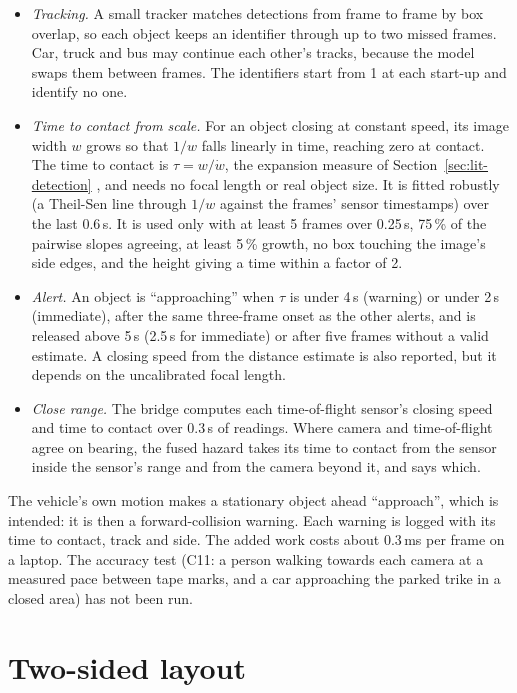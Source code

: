 \begin{itemize}
\item \emph{Tracking.} A small tracker matches detections from frame to frame by box overlap, so each object keeps an identifier through up to two missed frames. Car, truck and bus may continue each other's tracks, because the model swaps them between frames. The identifiers start from 1 at each start-up and identify no one.
\item \emph{Time to contact from scale.} For an object closing at constant speed, its image width $w$ grows so that $1/w$ falls linearly in time, reaching zero at contact. The time to contact is $\tau = w / \dot{w}$, the expansion measure of Section~\ref{sec:lit-detection} \cite{lee1976tau,dagan2004fcw}, and needs no focal length or real object size. It is fitted robustly (a Theil-Sen line \cite{sen1968} through $1/w$ against the frames' sensor timestamps) over the last 0.6\,s. It is used only with at least 5 frames over 0.25\,s, 75\,\% of the pairwise slopes agreeing, at least 5\,\% growth, no box touching the image's side edges, and the height giving a time within a factor of 2.
\item \emph{Alert.} An object is ``approaching'' when $\tau$ is under 4\,s (warning) or under 2\,s (immediate), after the same three-frame onset as the other alerts, and is released above 5\,s (2.5\,s for immediate) or after five frames without a valid estimate. A closing speed from the distance estimate is also reported, but it depends on the uncalibrated focal length.
\item \emph{Close range.} The bridge computes each time-of-flight sensor's closing speed and time to contact over 0.3\,s of readings. Where camera and time-of-flight agree on bearing, the fused hazard takes its time to contact from the sensor inside the sensor's range and from the camera beyond it, and says which.
\end{itemize}

The vehicle's own motion makes a stationary object ahead ``approach'', which is intended: it is then a forward-collision warning. Each warning is logged with its time to contact, track and side. The added work costs about 0.3\,ms per frame on a laptop. The accuracy test (C11: a person walking towards each camera at a measured pace between tape marks, and a car approaching the parked trike in a closed area) has not been run.

\section{Two-sided layout}
\label{sec:impl-twosided}

